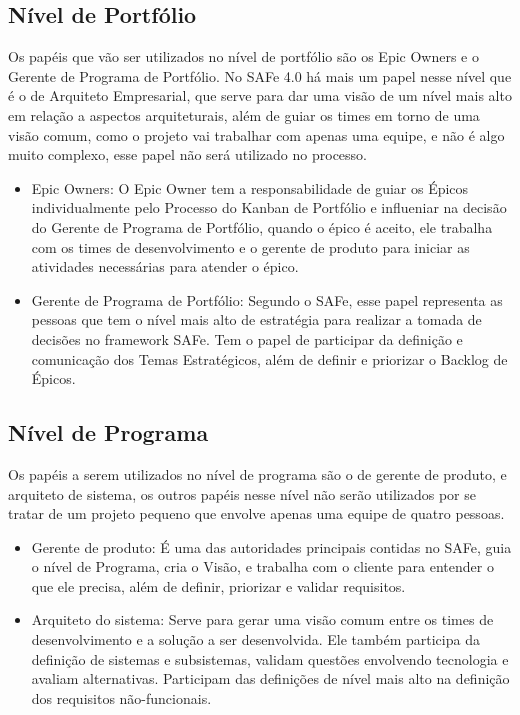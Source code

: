 \subsection{Nível de Portfólio}
Os papéis que vão ser utilizados no nível de portfólio são os Epic Owners e o Gerente de Programa de Portfólio. No SAFe 4.0 há mais um papel nesse nível que é o de Arquiteto Empresarial, que serve para dar uma visão de um nível mais alto em relação a aspectos arquiteturais, além de guiar os times em torno de uma visão comum,  como o projeto vai trabalhar com apenas uma equipe, e não é algo muito complexo, esse papel não será utilizado no processo.

\begin{itemize}
\item Epic Owners: O Epic Owner tem a responsabilidade de guiar os Épicos individualmente pelo Processo do Kanban de Portfólio e influeniar na decisão do Gerente de Programa de Portfólio, quando o épico é aceito, ele trabalha com os times de desenvolvimento e o gerente de produto para iniciar as atividades necessárias para atender o épico.
\item Gerente de Programa de Portfólio: Segundo o SAFe, esse papel representa as pessoas que tem o nível mais alto de estratégia para realizar a tomada de decisões no framework SAFe. Tem o papel de participar da definição  e comunicação dos Temas Estratégicos, além de definir e priorizar o Backlog de Épicos.
\end{itemize}

\subsection{Nível de Programa}
Os papéis a serem utilizados no nível de programa são o de gerente de produto, e arquiteto de sistema, os outros papéis nesse nível não serão utilizados por se tratar de um projeto pequeno que envolve apenas uma equipe de quatro pessoas.

\begin{itemize}
\item Gerente de produto: É uma das autoridades principais contidas no SAFe, guia o nível de Programa, cria o Visão, e trabalha com o cliente para entender o que ele precisa, além de definir, priorizar e validar requisitos. 
\item Arquiteto do sistema: Serve para gerar uma visão comum entre os times de desenvolvimento e a solução a ser desenvolvida. Ele também participa da definição de sistemas e subsistemas, validam questões envolvendo tecnologia e avaliam alternativas. Participam das definições de nível mais alto na definição dos requisitos não-funcionais.
\end{itemize}

